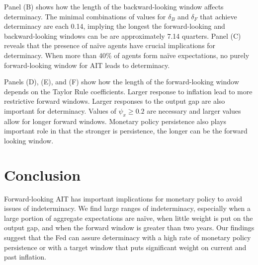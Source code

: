\documentclass[english,authoryear,12pt]{elsarticle}
\begin{document}
Panel (B) shows how the length of the backward-looking window affects determinacy. The minimal combinations of values for $\delta_B$ and $\delta_F$ that achieve determinacy are each 0.14, implying the longest the forward-looking and backward-looking windows can be are approximately 7.14 quarters. Panel (C) reveals that the presence of na\"ive agents have crucial implications for determinacy. When more than 40\% of agents form na\"ive expectations, no purely forward-looking window for AIT leads to determinacy.

Panels (D), (E), and (F) show how the length of the forward-looking window depends on the Taylor Rule coefficients. Larger response to inflation lead to more restrictive forward windows. Larger responses to the output gap are also important for determinacy. Values of $\psi_x \geq 0.2$ are necessary and larger values allow for longer forward windows.  Monetary policy persistence also plays important role in that the stronger is persistence, the longer can be the forward looking window.

\section{Conclusion}

Forward-looking AIT has important implications for monetary policy to avoid issues of indeterminacy. We find large ranges of indeterminacy, especially when a large portion of aggregate expectations are na\"ive, when little weight is put on the output gap, and when the forward window is greater than two years. Our findings suggest that the Fed can assure determinacy with a high rate of monetary policy persistence or with a target window that puts significant weight on current and past inflation.



\end{document}
